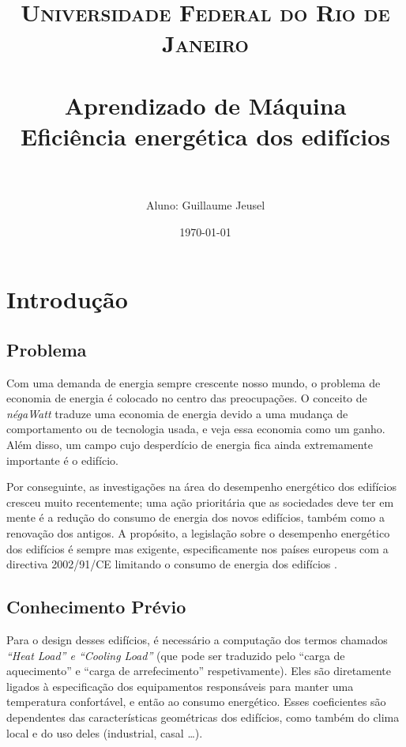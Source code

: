 \documentclass[paper=a4, fontsize=11pt]{article} %
\title{
\normalfont \normalsize
\textsc{Universidade Federal do Rio de Janeiro} \\ [25pt] %
\horrule{0.5pt} \\[0.4cm] %
\huge Aprendizado de Máquina\\Eficiência energética dos edifícios \\ %
\horrule{2pt} \\[0.5cm] %
}
\author{Aluno: Guillaume Jeusel} %
\date{\normalsize\today} %
\date{\parbox{\linewidth}\bigskip%
  Professor: Alexandre G. Evsukoff \endgraf\bigskip
  Disciplina: Inteligência Computacional \endgraf\bigskip
  {\centering\normalsize\today\endgraf}
  }
\numberwithin{equation}{section} %
\numberwithin{figure}{section} %
\numberwithin{table}{section} %
\begin{document}
\maketitle %

\newpage
\tableofcontents %

\newpage
\section{Introdução}

\subsection{Problema}
Com uma demanda de energia sempre crescente nosso mundo, o problema de economia de energia é colocado no centro das preocupações.
O conceito de \emph{négaWatt} \cite{ref_negawatt} traduze uma economia de energia devido a uma mudança de comportamento ou de tecnologia usada, e veja essa economia como um ganho.
Além disso, um campo cujo desperdício de energia fica ainda extremamente importante é o edifício.

Por conseguinte, as investigações na área do desempenho energético dos edifícios cresceu muito recentemente;
uma ação prioritária que as sociedades deve ter em mente é a redução do consumo de energia dos novos edifícios, também como a renovação dos antigos.
A propósito, a legislação sobre o desempenho energético dos edifícios é sempre mas exigente,
especificamente nos países europeus com a directiva 2002/91/CE limitando o consumo de energia dos edifícios \cite{ref_europ_energ}.


\subsection{Conhecimento Prévio}
Para o design desses edifícios, é necessário a computação dos termos chamados \emph{“Heat Load” e “Cooling Load”}
(que pode ser traduzido pelo “carga de aquecimento” e “carga de arrefecimento” respetivamente).
Eles são diretamente ligados à especificação dos equipamentos responsáveis para manter uma temperatura confortável, e então ao consumo energético.
Esses coeficientes são dependentes das características geométricas dos edifícios, como também do clima local e do uso deles (industrial, casal …).
\end{document}
